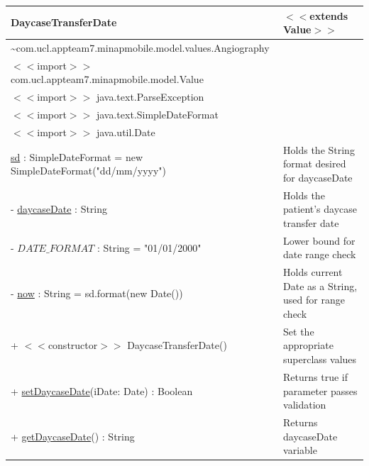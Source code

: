 \documentclass[12pt,a4paper,oneside,titlepage]{article}
\begin{document}
\begin{center}
	\begin{tabular}{| p{13cm} | p{5cm} |}
	\hline
	\textbf{DaycaseTransferDate} & \textbf{$<<$extends Value$>>$} \\ \hline
	\textasciitilde com.ucl.appteam7.minapmobile.model.values.Angiography & \\ \hline
	$<<$import$>>$ com.ucl.appteam7.minapmobile.model.Value & \\ \hline
	$<<$import$>>$ java.text.ParseException & \\ \hline
	$<<$import$>>$ java.text.SimpleDateFormat & \\ \hline
	$<<$import$>>$ java.util.Date & \\ \hline \hline
	\underline{sd} : SimpleDateFormat = new SimpleDateFormat("dd/mm/yyyy") & Holds the String format desired for daycaseDate \\ \hline
	- \underline{daycaseDate} : String & Holds the patient's daycase transfer date \\ \hline
	- \underline{$DATE\_FORMAT$} : String = "01/01/2000" & Lower bound for date range check \\ \hline
	- \underline{now} : String = sd.format(new Date()) & Holds current Date as a String, used for range check \\ \hline \hline
	+ $<<$constructor$>>$ DaycaseTransferDate() & Set the appropriate superclass values \\ \hline
	+ \underline{setDaycaseDate}(iDate: Date) : Boolean & Returns true if parameter passes validation \\ \hline
	+ \underline{getDaycaseDate}() : String & Returns daycaseDate variable \\ \hline
	\end{tabular}
\end{center}
\end{document}
